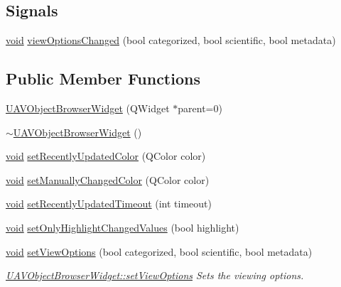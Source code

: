 \subsection*{\-Signals}
\begin{DoxyCompactItemize}
\item 
\hyperlink{group___u_a_v_objects_plugin_ga444cf2ff3f0ecbe028adce838d373f5c}{void} \hyperlink{group___u_a_v_object_browser_plugin_ga0fe8f51605067d863b1ac5bb6f6f5cbd}{view\-Options\-Changed} (bool categorized, bool scientific, bool metadata)
\end{DoxyCompactItemize}
\subsection*{\-Public \-Member \-Functions}
\begin{DoxyCompactItemize}
\item 
\hyperlink{group___u_a_v_object_browser_plugin_ga403353bfa1860704e97addda60292b5d}{\-U\-A\-V\-Object\-Browser\-Widget} (\-Q\-Widget $\ast$parent=0)
\item 
\hyperlink{group___u_a_v_object_browser_plugin_gacff305183afd2168e382970b086cf108}{$\sim$\-U\-A\-V\-Object\-Browser\-Widget} ()
\item 
\hyperlink{group___u_a_v_objects_plugin_ga444cf2ff3f0ecbe028adce838d373f5c}{void} \hyperlink{group___u_a_v_object_browser_plugin_gae78918a99387bda266b432b5ded9168e}{set\-Recently\-Updated\-Color} (\-Q\-Color color)
\item 
\hyperlink{group___u_a_v_objects_plugin_ga444cf2ff3f0ecbe028adce838d373f5c}{void} \hyperlink{group___u_a_v_object_browser_plugin_gaee39097c4bce5dcff47148b0bf22f9e7}{set\-Manually\-Changed\-Color} (\-Q\-Color color)
\item 
\hyperlink{group___u_a_v_objects_plugin_ga444cf2ff3f0ecbe028adce838d373f5c}{void} \hyperlink{group___u_a_v_object_browser_plugin_ga7c8fdd1c763ccc45089b7b7158f49630}{set\-Recently\-Updated\-Timeout} (int timeout)
\item 
\hyperlink{group___u_a_v_objects_plugin_ga444cf2ff3f0ecbe028adce838d373f5c}{void} \hyperlink{group___u_a_v_object_browser_plugin_ga964995701170a95cc21eb78fb25acb9d}{set\-Only\-Highlight\-Changed\-Values} (bool highlight)
\item 
\hyperlink{group___u_a_v_objects_plugin_ga444cf2ff3f0ecbe028adce838d373f5c}{void} \hyperlink{group___u_a_v_object_browser_plugin_ga21f21843b8cf0310d7cac16dbb79846c}{set\-View\-Options} (bool categorized, bool scientific, bool metadata)
\begin{DoxyCompactList}\small\item\em \hyperlink{group___u_a_v_object_browser_plugin_ga21f21843b8cf0310d7cac16dbb79846c}{\-U\-A\-V\-Object\-Browser\-Widget\-::set\-View\-Options} \-Sets the viewing options. \end{DoxyCompactList}\end{DoxyCompactItemize}


